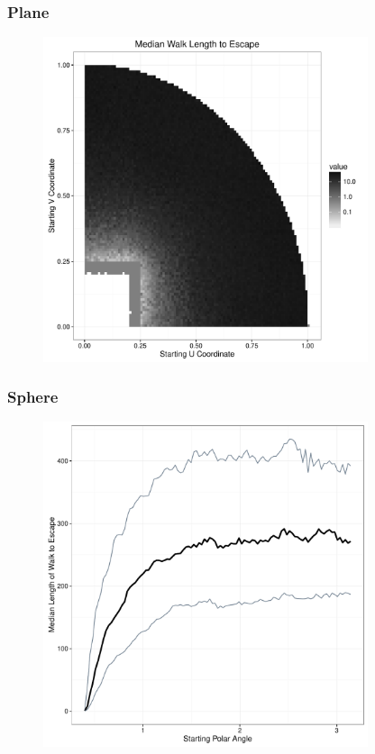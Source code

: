 \documentclass{beamer}
\begin{document}
\begin{frame}
	
	\frametitle{Plane}
	
	\begin{figure}
		\includegraphics[width=0.85\textwidth]{images/PlaneCircleL05.pdf}
	\end{figure}
	
\end{frame}


\begin{frame}
	
	\frametitle{Sphere}
	
	\begin{figure}
		\includegraphics[width=0.85\textwidth]{images/ExampleSphereL04.pdf}
	\end{figure}
	
\end{frame}
\end{document}
